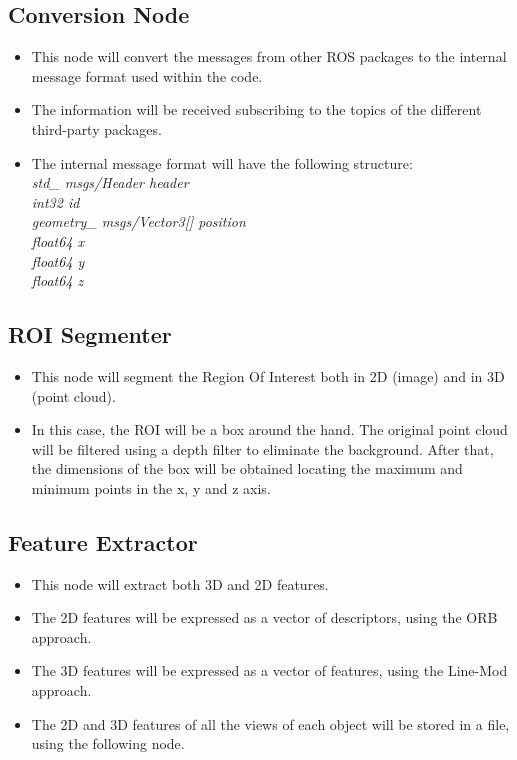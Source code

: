 \documentclass{article}
\begin{document}
\subsection{Conversion Node}
\begin{itemize}
\item This node will convert the messages from other ROS packages to the internal message format used within the code. 
\item The information will be received subscribing to the topics of the different third-party packages. 
\item The internal message format will have the following structure: \\[0.3cm]
\textit{
std\_ msgs/Header header\\[0.1cm]
int32 id\\[0.1cm]
geometry\_ msgs/Vector3[] position\\
\hspace*{0.5cm}float64 x\\
\hspace*{0.5cm}float64 y\\
\hspace*{0.5cm}float64 z\\
}
\end{itemize}


\subsection{ROI Segmenter}
\begin{itemize}
	\item This node will segment the Region Of Interest both in 2D (image) and in 3D (point cloud). 
	\item In this case, the ROI will be a box around the hand. The original point cloud will be filtered using a depth filter to eliminate the background. After that, the dimensions of the box will be obtained locating the maximum and minimum points in the x, y and z axis. 
\end{itemize}


\subsection{Feature Extractor}
\begin{itemize}
\item This node will extract both 3D and 2D features. 
\item The 2D features will be expressed as a vector of descriptors, using the ORB approach. 
\item The 3D features will be expressed as a vector of features, using the Line-Mod approach.

\item The 2D and 3D features of all the views of each object will be stored in a file, using the following node.  
\end{itemize}
\end{document}
